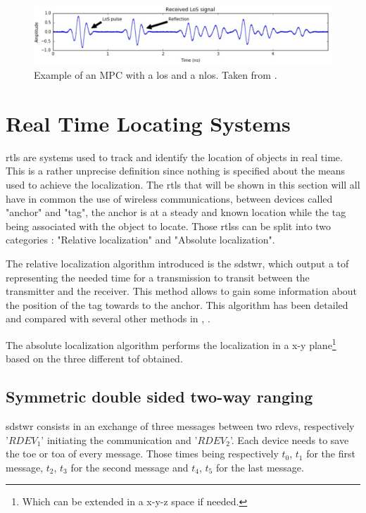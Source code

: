 \begin{figure}[H]
\centering
\includegraphics[width=.9\linewidth]{Images/mpc_pulses.png}
\caption{Example of an MPC with a \gls{los} and a \gls{nlos}. Taken from \cite{defraye2017determining}.}
\label{fig:UWB_MPC_Theo}
\end{figure}

\section{Real Time Locating Systems}
\label{rtls}
\gls{rtls} are systems used to track and identify the location of objects in real time. This is a rather unprecise definition since nothing is specified about the means used to achieve the localization. The \gls{rtls} that will be shown in this section will all have in common the use of wireless communications, between devices called "anchor" and "tag", the anchor is at a steady and known location while the tag being associated with the object to locate. Those \glspl{rtls} can be split into two categories : "Relative localization" and "Absolute localization".
\vspace{2mm}

The relative localization algorithm introduced is the \gls{sdstwr}, which output a \gls{tof} representing the needed time for a transmission to transit between the transmitter and the receiver. This method allows to gain some information about the position of the tag towards to the anchor. This algorithm has been detailed and compared with several other methods in \cite{fesler2018high}, \cite{hannotier2019indoor}.
\vspace{2mm}

The absolute localization algorithm performs the localization in a x-y plane\footnote{Which can be extended in a x-y-z space if needed.} based on the three different \gls{tof} obtained.


\subsection{Symmetric double sided two-way ranging}
\label{sds2wr}

\gls{sdstwr} consists in an exchange of three messages between two \glspl{rdev}, respectively '$RDEV_1$' initiating the communication and '$RDEV_2$'. Each device needs to save the \gls{toe} or \gls{toa} of every message. Those times being respectively $t_0$, $t_1$ for the first message, $t_2$, $t_3$ for the second message and $t_4$, $t_5$ for the last message.
\vspace{2mm}

